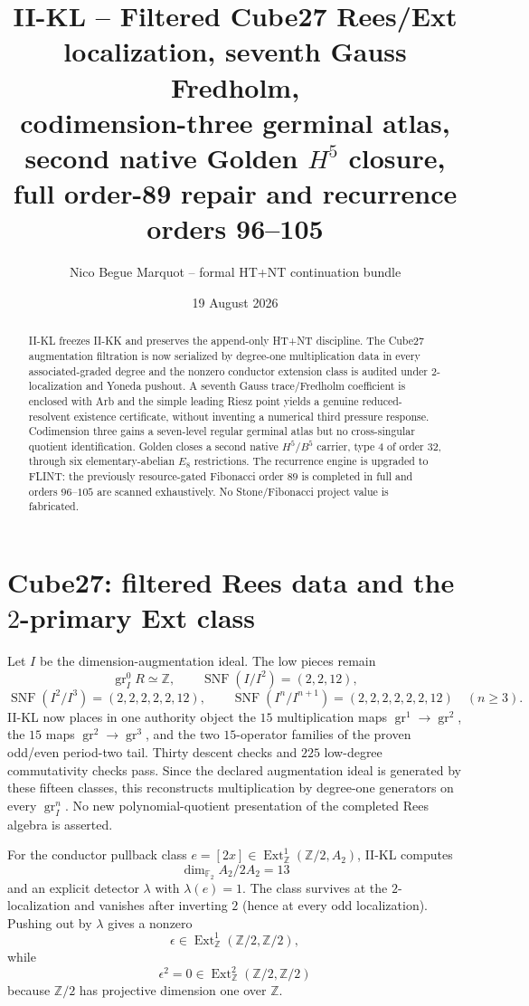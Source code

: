 \documentclass[10pt,a4paper]{article}
\title{\textbf{II-KL -- Filtered Cube27 Rees/Ext localization, seventh Gauss Fredholm,}\\\textbf{codimension-three germinal atlas, second native Golden $H^5$ closure,}\\\textbf{full order-89 repair and recurrence orders 96--105}}
\author{Nico Begue Marquot -- formal HT+NT continuation bundle}\date{19 August 2026}
\begin{document}
\maketitle\vspace{-1.35em}
\begin{abstract}\small
II-KL freezes II-KK and preserves the append-only HT+NT discipline.  The Cube27 augmentation filtration is now serialized by degree-one multiplication data in every associated-graded degree and the nonzero conductor extension class is audited under $2$-localization and Yoneda pushout.  A seventh Gauss trace/Fredholm coefficient is enclosed with Arb and the simple leading Riesz point yields a genuine reduced-resolvent existence certificate, without inventing a numerical third pressure response.  Codimension three gains a seven-level regular germinal atlas but no cross-singular quotient identification.  Golden closes a second native $H^5/B^5$ carrier, type 4 of order 32, through six elementary-abelian $E_8$ restrictions.  The recurrence engine is upgraded to FLINT: the previously resource-gated Fibonacci order $89$ is completed in full and orders $96$--$105$ are scanned exhaustively.  No Stone/Fibonacci project value is fabricated.
\end{abstract}
\section{Cube27: filtered Rees data and the $2$-primary Ext class}
Let $I$ be the dimension-augmentation ideal.  The low pieces remain
\[
\operatorname{gr}_I^0R\simeq\mathbb Z,\qquad
\operatorname{SNF}(I/I^2)=(2,2,12),
\]
\[
\operatorname{SNF}(I^2/I^3)=(2,2,2,2,2,12),\qquad
\operatorname{SNF}(I^n/I^{n+1})=(2,2,2,2,2,2,12)\quad(n\ge3).
\]
II-KL now places in one authority object the $15$ multiplication maps $\operatorname{gr}^1\to\operatorname{gr}^2$, the $15$ maps $\operatorname{gr}^2\to\operatorname{gr}^3$, and the two $15$-operator families of the proven odd/even period-two tail.  Thirty descent checks and $225$ low-degree commutativity checks pass.  Since the declared augmentation ideal is generated by these fifteen classes, this reconstructs multiplication by degree-one generators on every $\operatorname{gr}_I^n$.  No new polynomial-quotient presentation of the completed Rees algebra is asserted.

For the conductor pullback class $e=[2x]\in\operatorname{Ext}^1_{\mathbb Z}(\mathbb Z/2,A_2)$, II-KL computes
\[
\boxed{\dim_{\mathbb F_2} A_2/2A_2=13}
\]
and an explicit detector $\lambda$ with $\lambda(e)=1$.  The class survives at the $2$-localization and vanishes after inverting $2$ (hence at every odd localization).  Pushing out by $\lambda$ gives a nonzero
\[
\epsilon\in\operatorname{Ext}^1_{\mathbb Z}(\mathbb Z/2,\mathbb Z/2),
\]
while
\[
\boxed{\epsilon^2=0\in\operatorname{Ext}^2_{\mathbb Z}(\mathbb Z/2,\mathbb Z/2)}
\]
because $\mathbb Z/2$ has projective dimension one over $\mathbb Z$.
\end{document}
